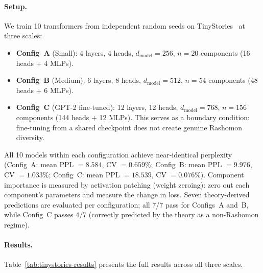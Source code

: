 \documentclass{article}
\begin{document}
\paragraph{Setup.}
We train 10 transformers from independent random seeds on TinyStories~\citep{eldan2023tinystories} at three scales:
\begin{itemize}
  \item \textbf{Config~A} (Small): 4 layers, 4 heads, $d_{\text{model}} = 256$, $n = 20$ components (16 heads + 4 MLPs).
  \item \textbf{Config~B} (Medium): 6 layers, 8 heads, $d_{\text{model}} = 512$, $n = 54$ components (48 heads + 6 MLPs).
  \item \textbf{Config~C} (GPT-2 fine-tuned): 12 layers, 12 heads, $d_{\text{model}} = 768$, $n = 156$ components (144 heads + 12 MLPs). This serves as a boundary condition: fine-tuning from a shared checkpoint does not create genuine Rashomon diversity.
\end{itemize}
All 10 models within each configuration achieve near-identical perplexity (Config~A: mean PPL $= 8.584$, CV $= 0.659\%$; Config~B: mean PPL $= 9.976$, CV $= 1.033\%$; Config~C: mean PPL $= 18.539$, CV $= 0.076\%$).
Component importance is measured by activation patching (weight zeroing): zero out each component's parameters and measure the change in loss.
Seven theory-derived predictions are evaluated per configuration; all 7/7 pass for Configs~A and~B, while Config~C passes 4/7 (correctly predicted by the theory as a non-Rashomon regime).

\paragraph{Results.}
Table~\ref{tab:tinystories-results} presents the full results across all three scales.
\end{document}
